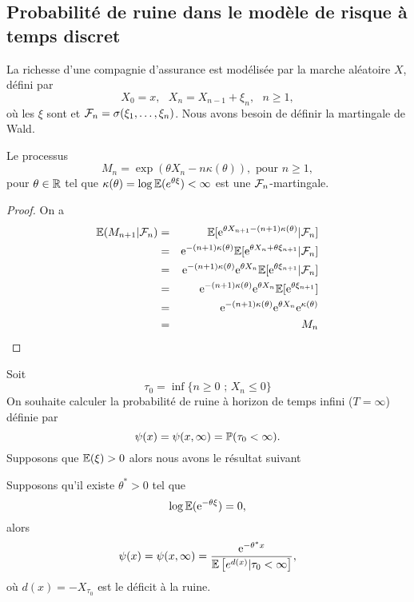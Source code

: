 \subsection{Probabilité de ruine dans le modèle de risque à temps discret}
La richesse d'une compagnie d'assurance est modélisée par la marche aléatoire $X$, défini par 
$$
X_0 = x,\text{ }X_n = X_{n-1} +\xi_n,\text{ }n\geq 1, 
$$
où les $\xi$ sont \iid et $\mathcal{F}_n = \sigma(\xi_1,\ldots, \xi_n)$. Nous avons besoin de définir la martingale de Wald. 
\begin{prop}
Le processus  
$$
M_n = \exp(\theta X_n - n\kappa(\theta)),\text{ pour }n\geq1,
$$
pour $\theta\in \mathbb{R}$ tel que $\kappa(\theta) = \log\mathbb{E}(e^{\theta\xi})<\infty$ est une $\mathcal{F}_n$-martingale.
\end{prop}
\begin{proof}
On a 
\begin{eqnarray*}
\mathbb{E}(M_{n+1}|\mathcal{F}_n) &=& \mathbb{E}[\mathrm{e}^{\theta X_{n+1} - (n+1)\kappa(\theta)}|\mathcal{F}_n]\\
&=& \mathrm{e}^{-(n+1)\kappa(\theta)}\mathbb{E}[\mathrm{e}^{\theta X_{n} +\theta\xi_{n+1} }|\mathcal{F}_n]\\
&=& \mathrm{e}^{-(n+1)\kappa(\theta)}\mathrm{e}^{\theta X_{n}}\mathbb{E}[ \mathrm{e}^{\theta\xi_{n+1} }|\mathcal{F}_n]\\
&=& \mathrm{e}^{-(n+1)\kappa(\theta)}\mathrm{e}^{\theta X_{n}}\mathbb{E}[ \mathrm{e}^{\theta\xi_{n+1} }]\\
&=& \mathrm{e}^{-(n+1)\kappa(\theta)}\mathrm{e}^{\theta X_{n}}\mathrm{e}^{\kappa(\theta)}\\
&=& M_n
\end{eqnarray*}
\end{proof}
Soit 
$$
\tau_0=\inf\{n\geq0\text{ ; }X_n \leq0\} 
$$
On souhaite calculer la probabilité de ruine à horizon de temps infini ($T = \infty$) définie par 
$$
\psi(x) = \psi(x,\infty) = \mathbb{P}(\tau_0 <\infty).
$$
Supposons que $\mathbb{E}(\xi)>0$ alors nous avons le résultat suivant 
\begin{prop}
Supposons qu'il existe $\theta^{\ast}>0$ tel que
$$
\log\mathbb{E}(\mathrm{e}^{-\theta\xi}) = 0,
$$
alors
$$
\psi(x) = \psi(x,\infty) = \frac{\mathrm{e}^{-\theta^\ast x}}{\mathbb{E}\left[e^{d(x)}|\tau_0 <\infty\right]},
$$
où $d(x) = - X_{\tau_0}$ est le déficit à la ruine.
\end{prop}
